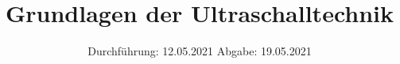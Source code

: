 

\subject{Versuch Nr.US1}
\title{Grundlagen der Ultraschalltechnik}
\date{%
  Durchführung: 12.05.2021
  \hspace{3em}
  Abgabe: 19.05.2021
}



\maketitle
\thispagestyle{empty}
\tableofcontents
\newpage 








\nocite{*}

\printbibliography{}


